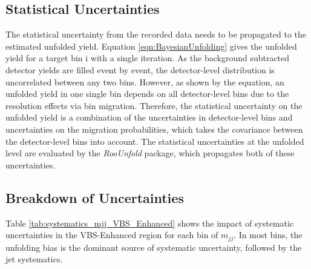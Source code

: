 \subsection{Statistical Uncertainties}
\label{subsubsec:StatUnc}
The statistical uncertainty from the recorded data needs to be propagated to the estimated unfolded yield. Equation \ref{eqn:BayesianUnfolding} gives the unfolded yield for a target bin i with a single iteration. As the background subtracted detector yields are filled event by event, the detector-level distribution is uncorrelated between any two bins. However, as shown by the equation, an unfolded yield in one single bin depends on all detector-level bins due to the resolution effects via bin migration. Therefore, the statistical uncertainty on the unfolded yield is a combination of the uncertainties in detector-level bins and uncertainties on the migration probabilities, which takes the covariance between the detector-level bins into account. The statistical uncertainties at the unfolded level are evaluated by the \textit{RooUnfold} package, which propagates both of these uncertainties.

\subsection{Breakdown of Uncertainties }
\label{subsec:SysUncBreakdown}
Table \ref{tab:systematics_mjj_VBS_Enhanced} shows the impact of systematic uncertainties in the VBS-Enhanced region for each bin of $m_{jj}$. In most bins, the unfolding bias is the dominant source of systematic uncertainty, followed by the jet systematics. 

